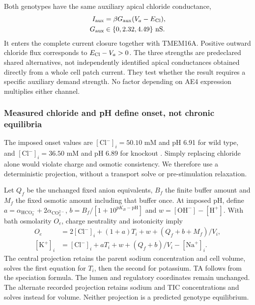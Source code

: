 \documentclass[11pt]{article}
\newcommand{\Na}{\mathrm{Na}^{+}}
\newcommand{\K}{\mathrm{K}^{+}}
\newcommand{\Cl}{\mathrm{Cl}^{-}}
\newcommand{\HCO}{\mathrm{HCO}_{3}^{-}}
\newcommand{\COthree}{\mathrm{CO}_{3}^{2-}}
\begin{document}
Both genotypes have the same auxiliary apical chloride conductance,
\begin{equation}
\begin{aligned}
 I_{\rm aux}&=\beta G_{\rm aux}(V_a-E_{\rm Cl}),\\
 G_{\rm aux}&\in\{0,2.32,4.49\}\ {\rm nS}.
\end{aligned}
 \label{eq:shared-demand}
\end{equation}
It enters the complete current closure together with TMEM16A. Positive outward chloride flux corresponds to $E_{\rm Cl}-V_a>0$. The three strengths are predeclared shared alternatives, not independently identified apical conductances obtained directly from a whole cell patch current. They test whether the result requires a specific auxiliary demand strength. No factor depending on AE4 expression multiplies either channel.

\subsubsection{Measured chloride and pH define onset, not chronic equilibria}

The imposed onset values are $[\Cl]_i=50.10$ mM and pH 6.91 for wild type, and $[\Cl]_i=36.50$ mM and pH 6.89 for knockout \citep{Pena2015}. Simply replacing chloride alone would violate charge and osmotic consistency. We therefore use a deterministic projection, without a transport solve or pre-stimulation relaxation.

Let $Q_f$ be the unchanged fixed anion equivalents, $B_f$ the finite buffer amount and $M_f$ the fixed osmotic amount including that buffer once. At imposed pH, define $a=\alpha_{\HCO}+2\alpha_{\COthree}$, $b=B_f/[1+10^{pK_B-\mathrm{pH}}]$ and $w=[\mathrm{OH}^-]-[\mathrm H^+]$. With bath osmolarity $O_e$, charge neutrality and isotonicity imply
\begin{align}
 O_e&=2[\Cl]_i+(1+a)T_i+w+(Q_f+b+M_f)/V_i,\\
 [\K]_i&=[\Cl]_i+aT_i+w+(Q_f+b)/V_i-[\Na]_i.
 \label{eq:onset-projection}
\end{align}
The central projection retains the parent sodium concentration and cell volume, solves the first equation for $T_i$, then the second for potassium. TA follows from the speciation formula. The lumen and regulatory coordinates remain unchanged. The alternate recorded projection retains sodium and TIC concentrations and solves instead for volume. Neither projection is a predicted genotype equilibrium.
\end{document}
